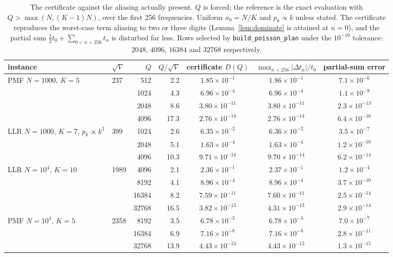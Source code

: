 \documentclass[11pt]{article}
\begin{document}
\begin{table}[t]
\centering
\small
\begin{tabular}{llrrccc}
\toprule
instance & $\sqrt V$ & $Q$ & $Q/\sqrt V$ & certificate $D(Q)$ & $\max_{n<256}|\Delta t_n|/t_0$ & partial-sum error \\
\midrule
PMF $N=1000$, $K=5$  & 237   & 512   & 2.2  & $1.85\times10^{-1}$ & $1.86\times10^{-1}$ & $7.1\times10^{-6}$ \\
                     &       & 1024  & 4.3  & $6.96\times10^{-4}$ & $6.96\times10^{-4}$ & $1.1\times10^{-9}$ \\
                     &       & 2048  & 8.6  & $3.80\times10^{-11}$ & $3.80\times10^{-11}$ & $2.3\times10^{-13}$ \\
                     &       & 4096  & 17.3 & $2.76\times10^{-14}$ & $2.76\times10^{-14}$ & $6.4\times10^{-16}$ \\
\midrule
LLR $N=1000$, $K=7$, $p_k\propto k^2$ & 399 & 1024 & 2.6 & $6.35\times10^{-2}$ & $6.36\times10^{-2}$ & $3.5\times10^{-7}$ \\
                     &       & 2048  & 5.1  & $1.63\times10^{-4}$ & $1.63\times10^{-4}$ & $1.2\times10^{-10}$ \\
                     &       & 4096  & 10.3 & $9.71\times10^{-14}$ & $9.70\times10^{-14}$ & $6.2\times10^{-14}$ \\
\midrule
LLR $N=10^4$, $K=10$ & 1989  & 4096  & 2.1  & $2.36\times10^{-1}$ & $2.37\times10^{-1}$ & $1.2\times10^{-4}$ \\
                     &       & 8192  & 4.1  & $8.96\times10^{-4}$ & $8.96\times10^{-4}$ & $3.7\times10^{-10}$ \\
                     &       & 16384 & 8.2  & $7.59\times10^{-11}$ & $7.60\times10^{-11}$ & $2.5\times10^{-14}$ \\
                     &       & 32768 & 16.5 & $3.82\times10^{-13}$ & $4.31\times10^{-13}$ & $2.9\times10^{-14}$ \\
\midrule
PMF $N=10^4$, $K=5$  & 2358  & 8192  & 3.5  & $6.78\times10^{-3}$ & $6.78\times10^{-3}$ & $7.0\times10^{-7}$ \\
                     &       & 16384 & 6.9  & $7.16\times10^{-8}$ & $7.16\times10^{-8}$ & $2.8\times10^{-11}$ \\
                     &       & 32768 & 13.9 & $4.43\times10^{-13}$ & $4.43\times10^{-13}$ & $1.3\times10^{-15}$ \\
\bottomrule
\end{tabular}
\caption{The certificate against the aliasing actually present. $Q$ is forced; the reference is the
exact evaluation with $Q>\max(N,(K-1)N)$, over the first 256 frequencies. Uniform
$x_0=N/K$ and $p_k\propto k$ unless stated. The certificate reproduces the worst-case term aliasing to two or
three digits (Lemma~\ref{lem:dominate} is attained at $n=0$), and the partial sum
$\tfrac12t_0+\sum_{0<n<256}t_n$ is disturbed far less. Rows selected by
\texttt{build\_poisson\_plan} under the $10^{-10}$ tolerance: $2048$, $4096$, $16384$ and $32768$
respectively.}
\label{tab:cert}
\end{table}
\end{document}
